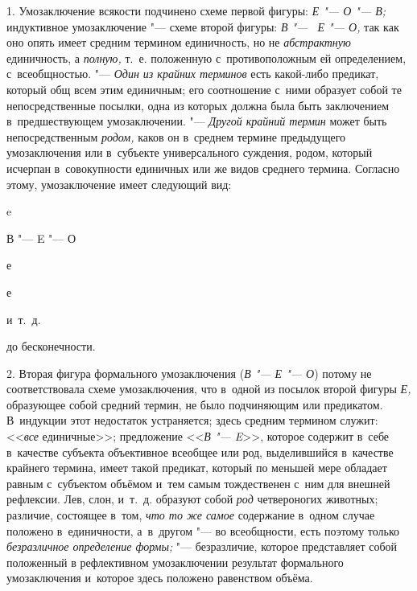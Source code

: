 1. Умозаключение всякости подчинено схеме первой фигуры:
{\em Е "--- О "--- В;} индуктивное умозаключение "--- схеме второй
фигуры: {\em В "--- ~Е "--- О,} так как оно опять имеет средним термином
единичность, но не {\em абстрактную} единичность, а {\em полную,} т.~е.
положенную с~противоположным ей определением,
с~всеобщностью. "--- {\em Один из крайних терминов} есть какой-либо предикат,
который общ всем этим единичным; его соотношение с~ними образует собой
те непосредственные посылки, одна из которых должна была быть заключением
в~предшествующем умозаключении. "--- {\em Другой крайний термин}
может быть непосредственным {\em родом,} каков он в~среднем термине
предыдущего умозаключения или в~субъекте универсального
суждения, родом, который исчерпан в~совокупности единичных или же видов
среднего термина. Согласно этому, умозаключение имеет следующий вид:

{\centering
e
\par}

{\centering
В "--- E "--- О
\par}

{\centering
е
\par}

{\centering
е
\par}

{\centering
и~т.~д.
\par}

{\centering
до бесконечности.
\par}

2. Вторая фигура формального умозаключения
({\em В "--- Е "--- О}) потому не соответствовала схеме
умозаключения, что в~одной из посылок второй фигуры
{\em Е,} образующее собой
средний термин, не было подчиняющим или предикатом. В~индукции этот
недостаток устраняется; здесь средним термином служит:
<<{\em все} единичные>>;
предложение <<{\em В "--- E}>>,
которое содержит в~себе в~качестве субъекта объективное
всеобщее или род, выделившийся в~качестве крайнего термина, имеет такой
предикат, который по меньшей мере обладает равным с~субъектом объёмом и~тем
самым тождественен с~ним для внешней рефлексии. Лев, слон, и~т.~д. образуют
собой {\em род} четвероногих животных; различие, состоящее в~том,
{\em что то же самое} содержание в~одном случае положено в~единичности,
а~в~другом "--- во всеобщности, есть поэтому только
{\em безразличное определение формы;}
"--- безразличие, которое представляет собой положенный в
рефлективном умозаключении результат формального умозаключения и~которое
здесь положено равенством объёма.

